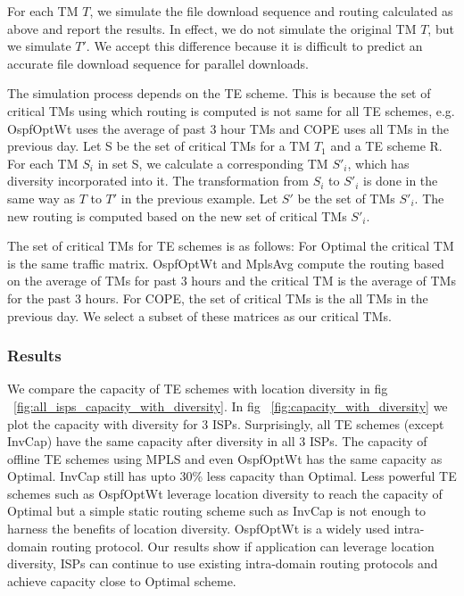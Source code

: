 For each TM $T$, we simulate the file download sequence and routing calculated as above and report the results. In effect, we do not simulate the original TM $T$, but we simulate  $T'$. We accept this difference because it is difficult to predict an accurate file download sequence for parallel downloads.

The simulation process depends on the TE scheme. This is because the set of critical TMs using which routing is computed is not same for all TE schemes, e.g.  OspfOptWt uses the average of past 3 hour TMs  and COPE uses all TMs in the previous day. Let S be the set of critical TMs for a TM $T_1$ and a TE scheme R. For each TM $S_i$ in set S, we calculate a corresponding TM $S'_i$, which has diversity incorporated into it. The transformation from $S_i$ to $S'_i$ is done in the same way as $T$ to $T'$ in the previous example. Let $S'$ be the set of TMs $S'_i$. The new routing is computed based on the new set of critical TMs $S'_i$.

The set of critical TMs for TE schemes is as follows: For Optimal the critical TM is the same traffic matrix.  OspfOptWt and MplsAvg compute the routing based on the average of TMs for past 3 hours and the critical TM is the average of TMs for the past 3 hours.  For COPE, the set of critical TMs is the all TMs in the previous day. We select a subset of these matrices as our critical TMs.

\subsubsection{Results}

We compare the capacity of TE schemes with location diversity in fig ~\ref{fig:all_isps_capacity_with_diversity}. In fig ~\ref{fig:capacity_with_diversity} we plot the capacity with diversity for 3 ISPs. Surprisingly, all TE schemes (except InvCap) have the same capacity after diversity in all 3 ISPs. The capacity of offline TE schemes using MPLS and even OspfOptWt has the same capacity as Optimal. InvCap still has upto 30\% less capacity than Optimal. Less powerful TE schemes such as OspfOptWt leverage location diversity  to reach the capacity of Optimal but a simple static routing scheme such as InvCap is not enough to harness the benefits of location diversity. OspfOptWt is a widely used intra-domain routing protocol. Our results show if application can leverage location diversity, ISPs can continue to use existing intra-domain routing protocols and achieve capacity close to Optimal scheme.

